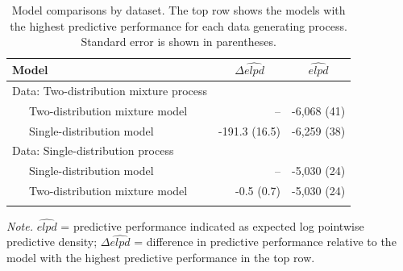 \documentclass[
  man,floatsintext]{apa7}
\begin{document}
\begin{table}[tbp]

\begin{center}
\begin{threeparttable}

\caption{\label{tab:loossim}Model comparisons by dataset. The top row shows the models with the highest predictive performance for each data generating process. Standard error is shown in parentheses.}

\begin{tabular}{lrr}
\toprule
Model & \multicolumn{1}{c}{$\Delta\widehat{elpd}$} & \multicolumn{1}{c}{$\widehat{elpd}$}\\
\midrule
Data: Two-distribution mixture process &  & \\
\ \ \ Two-distribution mixture model & -- & -6,068 (41)\\
\ \ \ Single-distribution model & -191.3 (16.5) & -6,259 (38)\\
Data: Single-distribution process &  & \\
\ \ \ Single-distribution model & -- & -5,030 (24)\\
\ \ \ Two-distribution mixture model & -0.5 (0.7) & -5,030 (24)\\
\bottomrule
\addlinespace
\end{tabular}

\begin{tablenotes}[para]
\normalsize{\textit{Note.} $\widehat{elpd}$ = predictive performance indicated as expected log pointwise predictive density; $\Delta\widehat{elpd}$ = difference in predictive performance relative to the model with the highest predictive performance in the top row.}
\end{tablenotes}

\end{threeparttable}
\end{center}

\end{table}

\newpage
\end{document}
